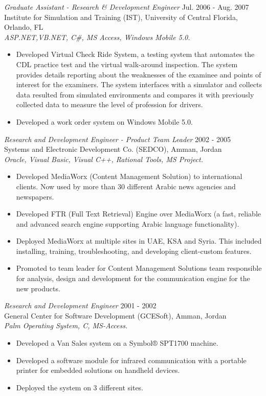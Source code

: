 \documentclass[line,margin]{res}
\begin{document}
\begin{resume}
{\sl Graduate Assistant - Research \& Development Engineer} \hfill    Jul. 2006
- Aug. 2007 \\
Institute for Simulation and Training (IST), University of Central Florida,
Orlando, FL \\ 
\textit{ASP.NET,VB.NET, C\#, MS Access, Windows Mobile 5.0.}
\begin{itemize} \itemsep -2pt
     \item Developed Virtual Check Ride System, a testing system that automates
     the CDL practice test and the virtual walk-around inspection. The system
     provides details reporting about the weaknesses of the examinee and points
     of interest for the examiners. The system interfaces with a simulator and
     collects data resulted from simulated environments and compares it with
     previously collected data to measure the level of profession for drivers.
     \item Developed a work order system on Windows Mobile 5.0.
\end{itemize} 

{\sl Research and Development Engineer - Product Team Leader} \hfill   2002 -
2005 \\
Systems and Electronic Development Co. (SEDCO), Amman, Jordan \\
\textit{Oracle, Visual Basic, Visual C++, Rational Tools, MS Project.}
\begin{itemize} \itemsep -2pt
     \item Developed MediaWorx (Content Management Solution) to international
     clients. Now used by more than 30 different Arabic news agencies and
     newspapers.
     \item Developed FTR (Full Text Retrieval) Engine over MediaWorx (a fast,
     reliable and advanced search engine supporting Arabic language 
     functionality).
     \item Deployed MediaWorx at multiple sites in UAE, KSA and Syria. This
     included installing, training, troubleshooting, and developing
     client-custom features.
     \item Promoted to team leader for Content Management Solutions team
     responsible for analysis, design and development for the communication
     engine for the new products.
\end{itemize} 

{\sl Research and Development Engineer} \hfill   2001 - 2002 \\
General Center for Software Development (GCESoft), Amman, Jordan \\
\textit{Palm Operating System, C, MS-Access.}
\begin{itemize} \itemsep -2pt
     \item Developed a Van Sales system on a Symbol® SPT1700 machine. 
     \item Developed a software module for infrared communication with a
     portable printer for embedded solutions on handheld devices.
     \item Deployed the system on 3 different sites.
\end{itemize} 


\end{resume}
\end{document}
